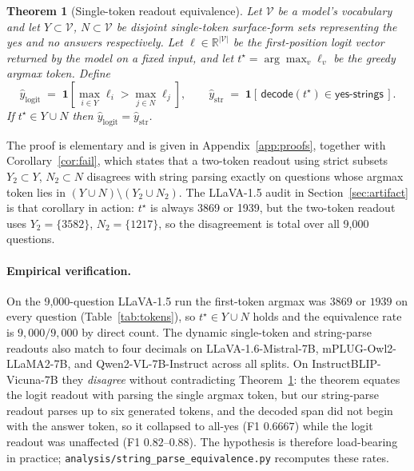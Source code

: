 \documentclass{article}
\newtheorem{theorem}{Theorem}
\begin{document}
\begin{theorem}[Single-token readout equivalence]
\label{thm:equiv}
Let $\mathcal{V}$ be a model's vocabulary and let
$Y \subset \mathcal{V}$, $N \subset \mathcal{V}$ be disjoint
single-token surface-form sets representing the yes and no answers
respectively. Let $\boldsymbol{\ell} \in \mathbb{R}^{|\mathcal{V}|}$
be the first-position logit vector returned by the model on a fixed
input, and let $t^\star = \arg\max_v \ell_v$ be the greedy argmax
token. Define
\[
\hat{y}_{\mathrm{logit}}
   \;=\;
   \mathbf{1}\!\left[\max_{i \in Y} \ell_i > \max_{j \in N} \ell_j\right],
\qquad
\hat{y}_{\mathrm{str}}
   \;=\;
   \mathbf{1}[\,\textsf{decode}(t^\star) \in \textsf{yes-strings}\,].
\]
If $t^\star \in Y \cup N$ then $\hat{y}_{\mathrm{logit}} = \hat{y}_{\mathrm{str}}$.
\end{theorem}

The proof is elementary and is given in Appendix~\ref{app:proofs},
together with Corollary~\ref{cor:fail}, which states that a two-token
readout using strict subsets $Y_2 \subset Y$, $N_2 \subset N$ disagrees
with string parsing exactly on questions whose argmax token lies in
$(Y \cup N) \setminus (Y_2 \cup N_2)$. The LLaVA-1.5 audit in
Section~\ref{sec:artifact} is that corollary in action: $t^\star$ is
always 3869 or 1939, but the two-token readout uses $Y_2 = \{3582\}$,
$N_2 = \{1217\}$, so the disagreement is total over all 9{,}000
questions.

\paragraph{Empirical verification.} On the 9{,}000-question LLaVA-1.5
run the first-token argmax was $3869$ or $1939$ on every question
(Table~\ref{tab:tokens}), so $t^\star \in Y \cup N$ holds and the
equivalence rate is $9{,}000/9{,}000$ by direct count. The dynamic
single-token and string-parse readouts also match to four decimals on
LLaVA-1.6-Mistral-7B, mPLUG-Owl2-LLaMA2-7B, and Qwen2-VL-7B-Instruct
across all splits. On InstructBLIP-Vicuna-7B they \emph{disagree}
without contradicting Theorem~\ref{thm:equiv}: the theorem equates the
logit readout with parsing the single argmax token, but our string-parse
readout parses up to six generated tokens, and the decoded span did not
begin with the answer token, so it collapsed to all-yes (F1 $0.6667$)
while the logit readout was unaffected (F1 $0.82$--$0.88$). The
hypothesis is therefore load-bearing in practice;
\texttt{analysis/string\_parse\_equivalence.py} recomputes these rates.
\end{document}
